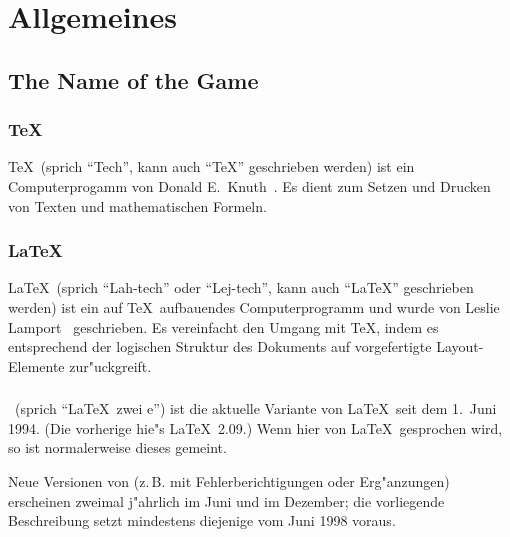 

\section{Allgemeines}
 
 
\subsection{The Name of the Game}
 
\subsubsection{\TeX}

\TeX\ (sprich "`Tech"', kann auch "`TeX"' geschrieben werden) ist
ein Computer\-progamm von Donald E.~Knuth~\cite{texbook,schwarz}.
Es dient zum Setzen und Drucken von Texten und mathematischen
Formeln.
 
\subsubsection{\LaTeX}
 
\LaTeX\ (sprich "`Lah-tech"' oder "`Lej-tech"', kann auch
"`LaTeX"' geschrieben werden) ist ein auf \TeX\ auf\/bauendes Computerprogramm
und wurde von Leslie Lamport~\cite{manual,wonne} geschrieben.
Es vereinfacht den Umgang mit \TeX, indem es 
entsprechend der logischen Struktur des Dokuments auf vorgefertigte
Layout-Elemente zur"uckgreift.

\subsubsection{\LaTeXe}

\LaTeXe\ (sprich "`\LaTeX\ zwei e"') ist die aktuelle Variante von
\LaTeX\ seit dem 1.~Juni 1994.  (Die vorherige hie"s \LaTeX~2.09.)
Wenn hier von \LaTeX\ gesprochen wird, so ist normalerweise dieses
\LaTeXe{} gemeint.

Neue Versionen  %
von \LaTeXe{} (z.\,B. mit Fehlerberichtigungen oder Er\-g"an\-zun\-gen)
erscheinen zweimal j"ahrlich im Juni und im 
Dezember; die vorliegende Beschreibung setzt mindestens diejenige
vom Juni 1998 voraus.  

